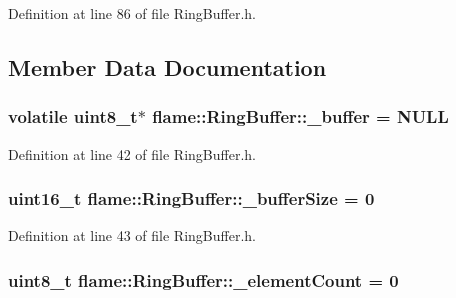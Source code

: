 Definition at line 86 of file Ring\-Buffer.\-h.



\subsection{Member Data Documentation}
\hypertarget{classflame_1_1_ring_buffer_a30f510a6336a693d8157650019d145fb}{
\subsubsection[{\-\_\-buffer}]{\setlength{\rightskip}{0pt plus 5cm}volatile uint8\-\_\-t$\ast$ flame\-::\-Ring\-Buffer\-::\-\_\-buffer = N\-U\-L\-L\hspace{0.3cm}{\ttfamily [protected]}}}\label{classflame_1_1_ring_buffer_a30f510a6336a693d8157650019d145fb}


Definition at line 42 of file Ring\-Buffer.\-h.

\hypertarget{classflame_1_1_ring_buffer_aac2742500299b783e4c236298ec3d58c}{
\subsubsection[{\-\_\-buffer\-Size}]{\setlength{\rightskip}{0pt plus 5cm}uint16\-\_\-t flame\-::\-Ring\-Buffer\-::\-\_\-buffer\-Size = 0\hspace{0.3cm}{\ttfamily [protected]}}}\label{classflame_1_1_ring_buffer_aac2742500299b783e4c236298ec3d58c}


Definition at line 43 of file Ring\-Buffer.\-h.

\hypertarget{classflame_1_1_ring_buffer_a7104672ac66311b90363c3919125a417}{
\subsubsection[{\-\_\-element\-Count}]{\setlength{\rightskip}{0pt plus 5cm}uint8\-\_\-t flame\-::\-Ring\-Buffer\-::\-\_\-element\-Count = 0\hspace{0.3cm}{\ttfamily [protected]}}}\label{classflame_1_1_ring_buffer_a7104672ac66311b90363c3919125a417}


